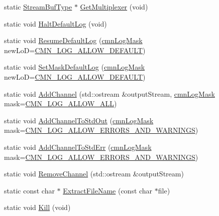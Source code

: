 \begin{DoxyCompactItemize}
\item 
static \hyperlink{classcmn_logger_a7d192777882d1dc6bb48ceac0b4e65bb}{Stream\-Buf\-Type} $\ast$ \hyperlink{classcmn_logger_aa9a44af4d1640661d784d1da92c9d394}{Get\-Multiplexer} (void)
\item 
static void \hyperlink{classcmn_logger_ac776c83953b0b6fc8797928dbdd88692}{Halt\-Default\-Log} (void)
\item 
static void \hyperlink{classcmn_logger_adbfa3e3002c704d689674f77c9deb525}{Resume\-Default\-Log} (\hyperlink{cmn_log_lo_d_8h_a44b6ef7560b0d204460b0a54f1a5d702}{cmn\-Log\-Mask} new\-Lo\-D=\hyperlink{cmn_log_lo_d_8h_a941e5ff3075571f0ad1e53e1204bd856}{C\-M\-N\-\_\-\-L\-O\-G\-\_\-\-A\-L\-L\-O\-W\-\_\-\-D\-E\-F\-A\-U\-L\-T})
\item 
static void \hyperlink{classcmn_logger_a1382ea96a6eb493c5aff86256b1f5fc7}{Set\-Mask\-Default\-Log} (\hyperlink{cmn_log_lo_d_8h_a44b6ef7560b0d204460b0a54f1a5d702}{cmn\-Log\-Mask} new\-Lo\-D=\hyperlink{cmn_log_lo_d_8h_a941e5ff3075571f0ad1e53e1204bd856}{C\-M\-N\-\_\-\-L\-O\-G\-\_\-\-A\-L\-L\-O\-W\-\_\-\-D\-E\-F\-A\-U\-L\-T})
\item 
static void \hyperlink{classcmn_logger_aa051a07e639b507c0db05af0aafd266e}{Add\-Channel} (std\-::ostream \&output\-Stream, \hyperlink{cmn_log_lo_d_8h_a44b6ef7560b0d204460b0a54f1a5d702}{cmn\-Log\-Mask} mask=\hyperlink{cmn_log_lo_d_8h_acf03c43c8a0fbe1c13b2aa4ac3b0a856}{C\-M\-N\-\_\-\-L\-O\-G\-\_\-\-A\-L\-L\-O\-W\-\_\-\-A\-L\-L})
\item 
static void \hyperlink{classcmn_logger_a3dc3179f73e32ba953e6c54f04e7e2a8}{Add\-Channel\-To\-Std\-Out} (\hyperlink{cmn_log_lo_d_8h_a44b6ef7560b0d204460b0a54f1a5d702}{cmn\-Log\-Mask} mask=\hyperlink{cmn_log_lo_d_8h_a4414b84b0d7c28e5df5728224b987125}{C\-M\-N\-\_\-\-L\-O\-G\-\_\-\-A\-L\-L\-O\-W\-\_\-\-E\-R\-R\-O\-R\-S\-\_\-\-A\-N\-D\-\_\-\-W\-A\-R\-N\-I\-N\-G\-S})
\item 
static void \hyperlink{classcmn_logger_a987bfb4a959245edb504f34392f16904}{Add\-Channel\-To\-Std\-Err} (\hyperlink{cmn_log_lo_d_8h_a44b6ef7560b0d204460b0a54f1a5d702}{cmn\-Log\-Mask} mask=\hyperlink{cmn_log_lo_d_8h_a4414b84b0d7c28e5df5728224b987125}{C\-M\-N\-\_\-\-L\-O\-G\-\_\-\-A\-L\-L\-O\-W\-\_\-\-E\-R\-R\-O\-R\-S\-\_\-\-A\-N\-D\-\_\-\-W\-A\-R\-N\-I\-N\-G\-S})
\item 
static void \hyperlink{classcmn_logger_a684d64bb96e292d9ef2eda7914545f09}{Remove\-Channel} (std\-::ostream \&output\-Stream)
\item 
static const char $\ast$ \hyperlink{classcmn_logger_a9467522ba63faf595dc3f2358102081a}{Extract\-File\-Name} (const char $\ast$file)
\item 
static void \hyperlink{classcmn_logger_a9c7aec5075fdb12cc8df86bfe306e073}{Kill} (void)
\end{DoxyCompactItemize}
